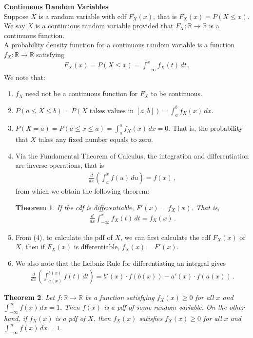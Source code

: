 \documentclass[11pt,oneside]{book}
\theoremstyle{newStyle}
\newtheorem{thm}{Theorem}[chapter]
\newcommand{\R}{\mathbb{R}}
\begin{document}
\textbf{Continuous Random Variables}\\

Suppose $X$ is a random variable with cdf $F_X(x)$, that is $F_X(x) = P(X\leq x)$. We say $X$ is a continuous random variable provided that $F_X:\R\to \R$ is a continuous function.\\

A probability density function for a continuous random variable is a function $f_X:\R \to \R$ satisfying 
\begin{align*}
F_X(x) = P(X\leq x) = \int_{-\infty}^x f_X(t) \, dt\,.
\end{align*}
We note that: 
\begin{enumerate}
\item $f_X$ need not be a continuous function for $F_X$ to be continuous. 
\item $P(a\leq X\leq b) = P(X\text{ takes values in }[a,b]) = \int_a^b f_X(x)\, dx$.
\item $P(X=a) = P(a\leq x\leq a) = \int_a^a f_X(x) \, dx = 0$. That is, the probability that $X$ takes any fixed number equals to zero. 
\item Via the Fundamental Theorem of Calculus, the integration and differentiation are inverse operations, that is
\begin{align*}
\frac{d}{dx}\left( \int_a^x f(u)\, du\right) = f(x) \,,
\end{align*}
from which we obtain the following theorem:
\begin{thm}
If the cdf is differentiable, $F'(x) = f_X(x)$. That is, 
\begin{align*}
\frac{d}{dx}\int_{-\infty}^x f_X(t) \, dt = f_X(x)\,.
\end{align*}
\end{thm}
\item From (4), to calculate the pdf of $X$, we can first calculate the cdf $F_X(x)$ of $X$, then if $F_X(x)$ is dfferentiable, $f_X(x) = F'(x)$. 
\item We also note that the Leibniz Rule for differentiating an integral gives
\begin{align*}
\frac{d}{dx}\left( \int^{b(x)}_{a(x)}f(t)\, dt\right) = b'(x)\cdot f(b(x)) - a'(x) \cdot f(a(x))\,.
\end{align*} 
\end{enumerate}


\begin{thm}
Let $f:\R \to \R$ be a function satisfying $f_X(x) \geq 0$ for all $x$ and $\int_{-\infty}^\infty f(x)\, dx  =1$. Then $f(x)$ is a pdf of some random variable. On the other hand, if $f_X(x)$ is a pdf of $X$, then $f_X(x)$ satisfies $f_X(x) \geq 0$ for all $x$ and $\int_{-\infty}^\infty f(x)\, dx  =1$.\\
\end{thm}
\hfill\break
\end{document}
